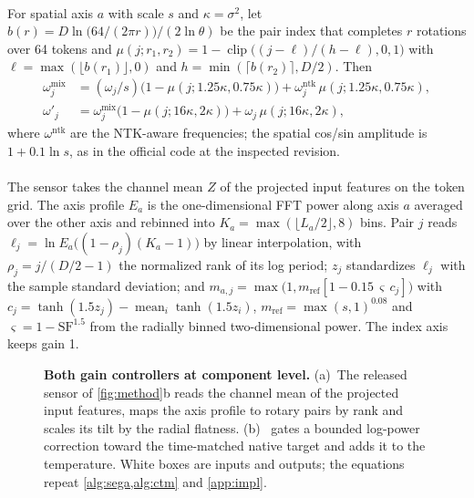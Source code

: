 \paragraph{\dype}
For spatial axis $a$ with scale $s$ and $\kappa=\sigma^2$, let $b(r)=D\ln\bigl(64/(2\pi r)\bigr)/(2\ln\theta)$ be the pair index that completes $r$ rotations over 64 tokens and $\mu(j;r_1,r_2)=1-\operatorname{clip}\bigl((j-\ell)/(h-\ell),0,1\bigr)$ with $\ell=\max(\lfloor b(r_1)\rfloor,0)$ and $h=\min(\lceil b(r_2)\rceil,D/2)$. Then
\[
\begin{aligned}
\omega^{\mathrm{mix}}_j&=(\omega_j/s)\bigl(1-\mu(j;1.25\kappa,0.75\kappa)\bigr)+\omega^{\mathrm{ntk}}_j\,\mu(j;1.25\kappa,0.75\kappa),\\
\omega'_j&=\omega^{\mathrm{mix}}_j\bigl(1-\mu(j;16\kappa,2\kappa)\bigr)+\omega_j\,\mu(j;16\kappa,2\kappa),
\end{aligned}
\]
where $\omega^{\mathrm{ntk}}$ are the NTK-aware frequencies; the spatial cos/sin amplitude is $1+0.1\ln s$, as in the official code at the inspected revision.

\paragraph{\segaofficial}
The sensor takes the channel mean $Z$ of the projected input features on the token grid. The axis profile $E_a$ is the one-dimensional FFT power along axis $a$ averaged over the other axis and rebinned into $K_a=\max(\lfloor L_a/2\rfloor,8)$ bins. Pair $j$ reads $\ell_j=\ln E_a\bigl((1-\rho_j)(K_a-1)\bigr)$ by linear interpolation, with $\rho_j=j/(D/2-1)$ the normalized rank of its log period; $z_j$ standardizes $\ell_j$ with the sample standard deviation; and $m_{a,j}=\max\bigl(1,m_{\mathrm{ref}}[1-0.15\,\varsigma\,c_j]\bigr)$ with $c_j=\tanh(1.5z_j)-\operatorname{mean}_i\tanh(1.5z_i)$, $m_{\mathrm{ref}}=\max(s,1)^{0.08}$ and $\varsigma=1-\mathrm{SF}^{1.5}$ from the radially binned two-dimensional power. The index axis keeps gain 1.

\begin{figure}[!htbp]
\centering
{}
\caption{\textbf{Both gain controllers at component level.} (a)~The released \sega{} sensor of \cref{fig:method}b reads the channel mean of the projected input features, maps the axis profile to rotary pairs by rank and scales its tilt by the radial flatness. (b)~\constancytm{} gates a bounded log-power correction toward the time-matched native target and adds it to the \sega{} temperature. White boxes are inputs and outputs; the equations repeat \cref{alg:sega,alg:ctm} and \cref{app:impl}.}
\label{fig:method_zoom}
\end{figure}

